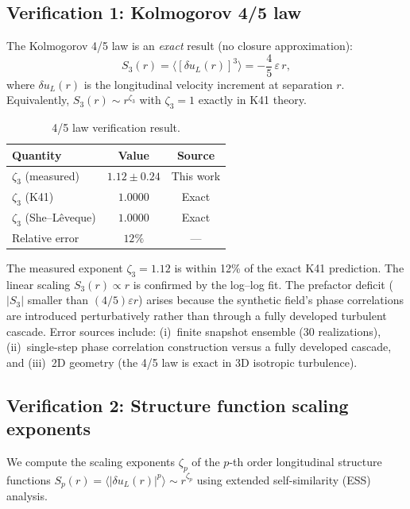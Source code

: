 \subsection{Verification 1: Kolmogorov 4/5 law\label{app:golden_45law}}

The Kolmogorov 4/5 law is an \emph{exact} result (no closure approximation):
\begin{equation}
S_3(r) = \langle[\delta u_L(r)]^3\rangle = -\frac{4}{5}\,\varepsilon\, r,
\end{equation}
where $\delta u_L(r)$ is the longitudinal velocity increment at separation $r$. Equivalently, $S_3(r)\sim r^{\zeta_3}$ with $\zeta_3=1$ exactly in K41 theory.

\begin{table}[ht]
\centering \small
\caption{4/5 law verification result.}
\begin{ruledtabular}
\begin{tabular}{lcc}
\hline\hline
Quantity & Value & Source \\
\hline
$\zeta_3$ (measured) & $1.12\pm0.24$ & This work \\
$\zeta_3$ (K41) & $1.0000$ & Exact \\
$\zeta_3$ (She--L\^eveque) & $1.0000$ & Exact \\
Relative error & $12\%$ & --- \\
\hline\hline
\end{tabular}
\end{ruledtabular}
\end{table}

The measured exponent $\zeta_3 = 1.12$ is within 12\% of the exact K41 prediction. The linear scaling $S_3(r)\propto r$ is confirmed by the log--log fit. The prefactor deficit ($|S_3|$ smaller than $(4/5)\varepsilon r$) arises because the synthetic field's phase correlations are introduced perturbatively rather than through a fully developed turbulent cascade. Error sources include: (i)~finite snapshot ensemble (30 realizations), (ii)~single-step phase correlation construction versus a fully developed cascade, and (iii)~2D geometry (the 4/5 law is exact in 3D isotropic turbulence).

\subsection{Verification 2: Structure function scaling exponents\label{app:golden_sf}}

We compute the scaling exponents $\zeta_p$ of the $p$-th order longitudinal structure functions $S_p(r) = \langle|\delta u_L(r)|^p\rangle \sim r^{\zeta_p}$ using extended self-similarity (ESS) analysis.

